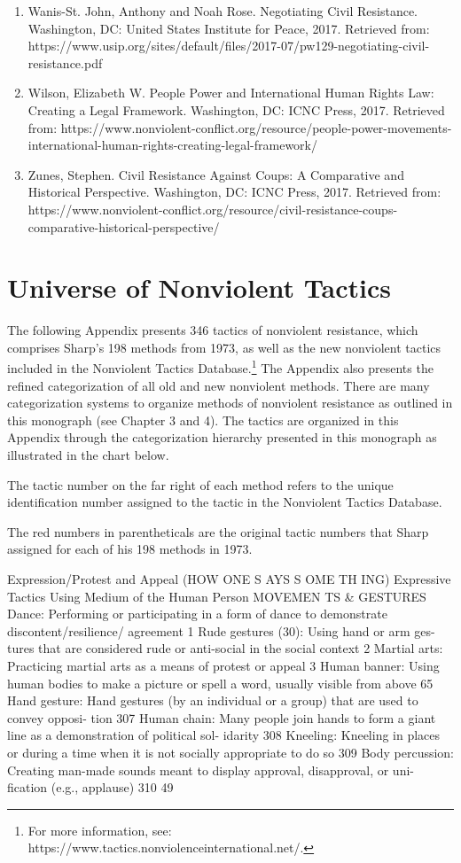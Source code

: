 \documentclass[twoside,a4paper,12pt,fleqn,openany]{extbook}
\begin{document}
\begin{enumerate}
\item Wanis-St. John, Anthony and Noah Rose. Negotiating Civil Resistance. Washington, DC: United
States Institute for Peace, 2017. Retrieved from: https://www.usip.org/sites/default/files/2017-07/pw129-negotiating-civil-resistance.pdf
\item Wilson, Elizabeth W. People Power and International Human Rights Law: Creating a Legal Framework. Washington, DC: ICNC Press, 2017. Retrieved from: https://www.nonviolent-conflict.org/resource/people-power-movements-international-human-rights-creating-legal-framework/
\item Zunes, Stephen. Civil Resistance Against Coups: A Comparative and Historical Perspective. Washington, DC: ICNC Press, 2017. Retrieved from: https://www.nonviolent-conflict.org/resource/civil-resistance-coups-comparative-historical-perspective/
\end{enumerate}

\appendix

\chapter*{Universe of Nonviolent Tactics}

The following Appendix presents 346 tactics of nonviolent resistance, which comprises Sharp’s 198 methods from 1973, as well as the new nonviolent tactics included in the Nonviolent Tactics Database.\footnote{For more information, see: https://www.tactics.nonviolenceinternational.net/.} The Appendix also presents the refined categorization of all old and new nonviolent methods. There are many categorization systems to organize methods of nonviolent resistance as outlined in this monograph (see Chapter 3 and 4). The tactics are organized in this Appendix through the categorization hierarchy presented in this monograph as illustrated in the chart below.

The tactic number on the far right of each method refers to the unique identification number assigned to the tactic in the Nonviolent Tactics Database.

The red numbers in parentheticals are the original tactic numbers that Sharp assigned for each of his 198 methods in 1973.

Expression/Protest and Appeal
(HOW ONE S AYS S OME TH ING)
Expressive Tactics Using Medium of the Human Person
MOVEMEN TS & GESTURES
Dance: Performing or participating in a form of
dance to demonstrate discontent/resilience/
agreement
 1
Rude gestures (30): Using hand or arm ges-
tures that are considered rude or anti-social in
the social context
 2
Martial arts: Practicing martial arts as a means
of protest or appeal
 3
Human banner: Using human bodies to make
a picture or spell a word, usually visible from
above
 65
Hand gesture: Hand gestures (by an individual
or a group) that are used to convey opposi-
tion
 307
Human chain: Many people join hands to form
a giant line as a demonstration of political sol-
idarity
 308
Kneeling: Kneeling in places or during a time
when it is not socially appropriate to do so		
309
Body percussion: Creating man-made sounds
meant to display approval, disapproval, or uni-
fication (e.g., applause)
 310
49
\end{document}
